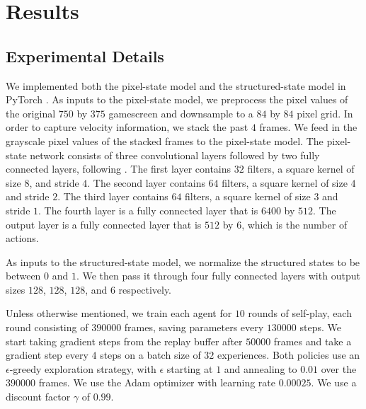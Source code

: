 \documentclass[10pt,twocolumn,letterpaper]{article}
\begin{document}
\section{Results}

\subsection{Experimental Details}
We implemented both the pixel-state model and the structured-state model in
PyTorch \citep{paszke2017automatic}. As inputs to the pixel-state model, we
preprocess the pixel values of the original $750$ by $375$ gamescreen and
downsample to a $84$ by $84$ pixel grid. In order to capture velocity
information, we stack the past $4$ frames. We feed in the grayscale pixel
values of the stacked frames to the pixel-state model. The pixel-state network
consists of three convolutional layers followed by two fully connected layers,
following \citep{nature2013}. The first layer contains $32$ filters, a square kernel
of size $8$, and stride $4$. The second layer contains $64$ filters, a square
kernel of size $4$ and stride $2$. The third layer contains $64$ filters, a
square kernel of size $3$ and stride $1$. The fourth layer is a fully
connected layer that is $6400$ by $512$. The output layer is a fully connected
layer that is $512$ by $6$, which is the number of actions.

As inputs to the structured-state model, we normalize the structured states to
be between $0$ and $1$. We then pass it through four fully connected layers
with output sizes $128$, $128$, $128$, and $6$ respectively.

Unless otherwise mentioned, we train each agent for $10$ rounds of self-play,
each round consisting of $390000$ frames, saving parameters every $130000$
steps. We start taking gradient steps from the replay buffer after $50000$
frames and take a gradient step every $4$ steps on a batch size of $32$
experiences. Both policies use an $\epsilon$-greedy exploration strategy, with
$\epsilon$ starting at $1$ and annealing to $0.01$ over the $390000$ frames.
We use the Adam optimizer \citep{kingma2014adam} with learning rate $0.00025$.
We use a discount factor $\gamma$ of $0.99$.
\end{document}
